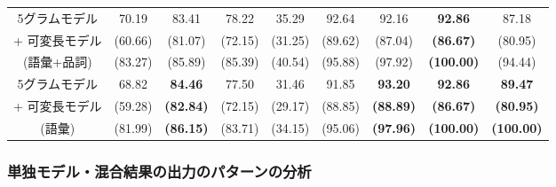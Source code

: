 \begin{table*}
\begin{scriptsize}
\begin{center}
\begin{tabular}{|c||c|c|c|c|c|c|c|c|}
5グラムモデル  
	& 70.19 	& 83.41 & 78.22   & 35.29   & 92.64 & 92.16 & {\bf 92.86} & 87.18 \\ 
+ 可変長モデル 
	& (60.66) & (81.07) &	(72.15) & (31.25) & (89.62) & (87.04) & {\bf (86.67)} & (80.95) \\ 
(語彙+品詞)
	& (83.27) & (85.89) &	(85.39) & (40.54) & (95.88) & (97.92) & {\bf (100.00)} & (94.44) \\ \hline

5グラムモデル  
	& 68.82  & {\bf 84.46} & 77.50   & 31.46   & 91.85 	& {\bf 93.20} & {\bf 92.86} & {\bf 89.47} \\ 
+ 可変長モデル 
	& (59.28) & {\bf (82.84)} &	(72.15) & (29.17) & (88.85) & {\bf (88.89)} & {\bf (86.67)} & {\bf (80.95)} \\ 
(語彙)
	& (81.99) & {\bf (86.15)} &	(83.71) & (34.15) & (95.06) & {\bf (97.96)} & {\bf (100.00)} & {\bf (100.00)} 
				\\ \hline
\end{tabular}
\end{center}
\end{scriptsize}
\end{table*}

\subsubsection{単独モデル・混合結果の出力のパターンの分析}



